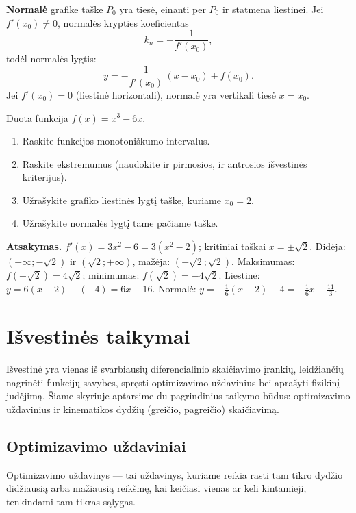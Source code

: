 \begin{definition}
\textbf{Normalė} grafike taške $P_0$ yra tiesė, einanti per $P_0$ ir
statmena liestinei. Jei $f'(x_0)\neq 0$, normalės krypties koeficientas
\[
  k_n = -\frac{1}{f'(x_0)},
\]
todėl normalės lygtis:
\[
  y = -\frac{1}{f'(x_0)}\,(x-x_0) + f(x_0).
\]
Jei $f'(x_0)=0$ (liestinė horizontali), normalė yra vertikali tiesė
$x = x_0$.
\end{definition}

\begin{exercise}
Duota funkcija $f(x) = x^3 - 6x$.
\begin{enumerate}[label=\alph*)]
  \item Raskite funkcijos monotoniškumo intervalus.
  \item Raskite ekstremumus (naudokite ir pirmosios, ir antrosios
        išvestinės kriterijus).
  \item Užrašykite grafiko liestinės lygtį taške, kuriame $x_0 = 2$.
  \item Užrašykite normalės lygtį tame pačiame taške.
\end{enumerate}

\textbf{Atsakymas.}
$f'(x)=3x^2-6=3(x^2-2)$; kritiniai taškai $x=\pm\sqrt{2}$.
Didėja: $(-\infty;{-\sqrt{2}})$ ir $(\sqrt{2};{+\infty})$,
mažėja: $(-\sqrt{2};\sqrt{2})$.
Maksimumas: $f(-\sqrt{2})=4\sqrt{2}$;
minimumas: $f(\sqrt{2})=-4\sqrt{2}$.
Liestinė: $y=6(x-2)+(-4)=6x-16$.
Normalė: $y=-\tfrac{1}{6}(x-2)-4=-\tfrac{1}{6}x-\tfrac{11}{3}$.
\end{exercise}

\section{Išvestinės taikymai}

Išvestinė yra vienas iš svarbiausių diferencialinio skaičiavimo įrankių, leidžiančių
nagrinėti funkcijų savybes, spręsti optimizavimo uždavinius bei aprašyti fizikinį
judėjimą. Šiame skyriuje aptarsime du pagrindinius taikymo būdus: optimizavimo
uždavinius ir kinematikos dydžių (greičio, pagreičio) skaičiavimą.

\subsection{Optimizavimo uždaviniai}

\begin{definition}
Optimizavimo uždavinys --- tai uždavinys, kuriame reikia rasti tam tikro dydžio
didžiausią arba mažiausią reikšmę, kai keičiasi vienas ar keli kintamieji,
tenkindami tam tikras sąlygas.
\end{definition}

